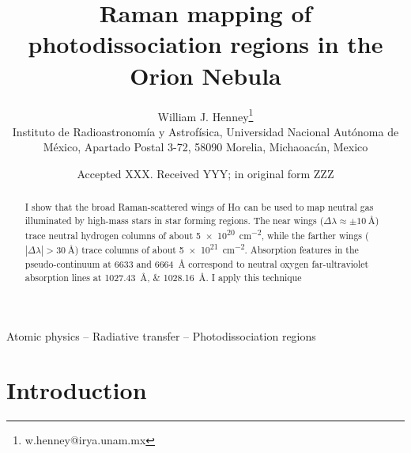 \documentclass[useAMS, usenatbib, a4paper]{mnras}
\title[Raman mapping of Orion PDRs]
{Raman mapping of photodissociation regions in the Orion Nebula}
\author[Henney]{
  William J. Henney\thanks{w.henney@irya.unam.mx}\\
  \foreignlanguage{spanish}{Instituto de Radioastronomía y
    Astrofísica, Universidad Nacional Autónoma de México, Apartado
    Postal 3-72, 58090 Morelia, Michaoacán, Mexico}}
\date{Accepted XXX. Received YYY; in original form ZZZ}
\begin{document}
\label{firstpage}
\pagerange{\pageref{firstpage}--\pageref{lastpage}}
\maketitle

\begin{abstract}
  I show that the broad Raman-scattered wings of H\(\alpha\) can be used to
  map neutral gas illuminated by high-mass stars in star forming
  regions. The near wings
  (\(\Delta\lambda \approx \pm \SI{10}{\angstrom}\)) trace neutral hydrogen columns of
  about \SI{5e20}{cm^{-2}}, while the farther wings
  (\(|\Delta\lambda| > \SI{30}{\angstrom}\)) trace columns of about
  \SI{5e21}{cm^{-2}}. Absorption features in the pseudo-continuum at
  6633 and 6664~\AA{} correspond to neutral oxygen far-ultraviolet
  absorption lines at \SIlist{1027.43;1028.16}{\angstrom}.
  I apply this technique 
\end{abstract}
\begin{keywords}
  Atomic physics -- Radiative transfer -- Photodissociation regions
\end{keywords}
\section{Introduction}
\label{sec:introduction}
\end{document}
